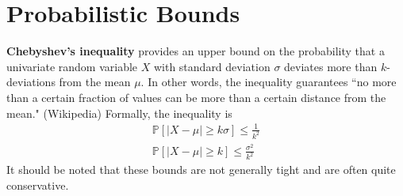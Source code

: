 \documentclass[10pt,a4paper]{article}
\begin{document}
	
	

\section{Probabilistic Bounds}

\textbf{Chebyshev's inequality} provides an upper bound on the probability that a univariate random variable $X$ with standard deviation $\sigma$ deviates more than $k$-deviations from the mean $\mu$. In other words, the inequality guarantees ``no more than a certain fraction of values can be more than a certain distance from the mean." (Wikipedia) Formally, the inequality is
\begin{align}
\mathbb{P}[|X-\mu|\ge k\sigma] \le \frac{1}{k^2} \\
\mathbb{P}[|X-\mu|\ge k] \le \frac{\sigma^2}{k^2} 
\end{align}
It should be noted that these bounds are not generally tight and are often quite conservative. 
\end{document}
